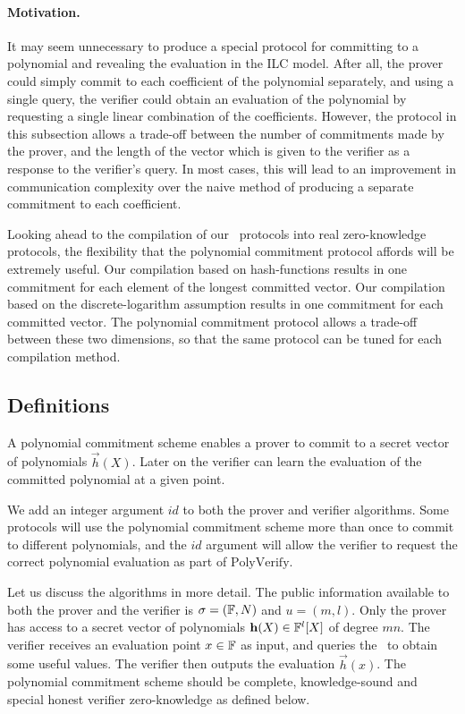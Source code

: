 \paragraph{Motivation.} It may seem unnecessary to produce a special protocol for committing to a polynomial and revealing the evaluation in the ILC model. After all, the prover could simply commit to each coefficient of the polynomial separately, and using a single query, the verifier could obtain an evaluation of the polynomial by requesting a single linear combination of the coefficients. However, the protocol in this subsection allows a trade-off between the number of commitments made by the prover, and the length of the vector which is given to the verifier as a response to the verifier's query. In most cases, this will lead to an improvement in communication complexity over the naive method of producing a separate commitment to each coefficient.

Looking ahead to the compilation of our \ILC\ protocols into real zero-knowledge protocols, the flexibility that the polynomial commitment protocol affords will be extremely useful. Our compilation based on hash-functions results in one commitment for each element of the longest committed vector. Our compilation based on the discrete-logarithm assumption results in one commitment for each committed vector. The polynomial commitment protocol allows a trade-off between these two dimensions, so that the same protocol can be tuned for each compilation method.

\subsection{Definitions}
A polynomial commitment scheme enables a prover to commit to a secret vector of polynomials $\vec{h}(X)$. Later on the verifier can learn the evaluation of the committed polynomial at a given point.

We add an integer argument $id$ to both the prover and verifier algorithms. Some protocols will use the polynomial commitment scheme more than once to commit to different polynomials, and the $id$ argument will allow the verifier to request the correct polynomial evaluation as part of $\mathrm{PolyVerify}$.

Let us discuss the algorithms in more detail. The public information available to both the prover and the verifier is $\mathsf{\sigma} = (\mathbb{F},N)$ and $u = (m,l)$. Only the prover has access to a secret vector of polynomials $\mathbf{h}(X) \in \mathbb{F}^l[X]$ of degree $mn$. The verifier receives an evaluation point $x \in \mathbb{F}$ as input, and queries the \ILC\ to obtain some useful values. The verifier then outputs the evaluation $\vec{h}(x)$. The polynomial commitment scheme should be complete, knowledge-sound and special honest verifier zero-knowledge as defined below.

